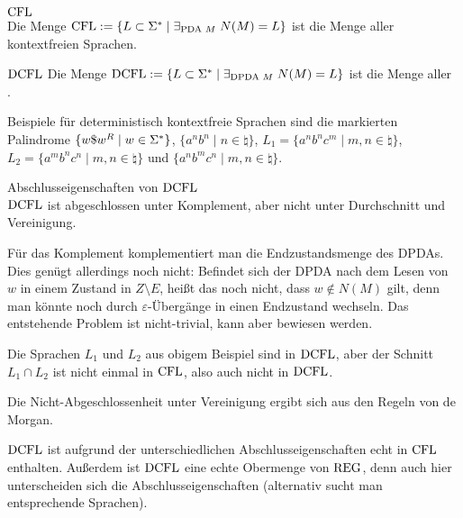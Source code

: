 \linie

\begin{Def}{$\text{CFL}$}\\
    Die Menge $\text{CFL} := \{L \subset \Sigma^\ast \;|\;
    \exists_{\text{PDA } M}\; N(M) = L\}$
    ist die Menge aller kontextfreien Sprachen.
\end{Def}

\begin{Def}{$\text{DCFL}$}
    Die Menge $\text{DCFL} := \{L \subset \Sigma^\ast \;|\;
    \exists_{\text{DPDA } M}\; N(M) = L\}$
    ist die Menge aller\\
    .
\end{Def}

\begin{Bsp}
    Beispiele für deterministisch kontextfreie Sprachen sind
    die markierten Palindrome $\{w \$ w^R \;|\; w \in \Sigma^\ast\}$,
    $\{a^n b^n \;|\; n \in \natural\}$,
    $L_1 = \{a^n b^n c^m \;|\; m, n \in \natural\}$,
    $L_2 = \{a^m b^n c^n \;|\; m, n \in \natural\}$ und
    $\{a^n b^m c^n \;|\; m, n \in \natural\}$.
\end{Bsp}

\linie

\begin{Satz}{Abschlusseigenschaften von $\text{DCFL}$}\\
    $\text{DCFL}$ ist abgeschlossen unter Komplement, aber nicht unter
    Durchschnitt und Vereinigung.
\end{Satz}

\begin{Beweis}
    Für das Komplement komplementiert man die Endzustandsmenge des DPDAs.
    Dies genügt allerdings noch nicht:
    Befindet sich der DPDA nach dem Lesen von $w$ in einem Zustand in
    $Z \setminus E$, heißt das noch nicht, dass $w \notin N(M)$ gilt,
    denn man könnte noch durch $\varepsilon$-Übergänge in einen Endzustand
    wechseln.
    Das entstehende Problem ist nicht-trivial, kann aber bewiesen werden.
    
    Die Sprachen $L_1$ und $L_2$ aus obigem Beispiel sind in $\text{DCFL}$,
    aber der Schnitt $L_1 \cap L_2$ ist nicht einmal in $\text{CFL}$, also auch
    nicht in $\text{DCFL}$.
    
    Die Nicht-Abgeschlossenheit unter Vereinigung ergibt sich aus den Regeln
    von de Morgan.
\end{Beweis}

\begin{Bem}
    $\text{DCFL}$ ist aufgrund der unterschiedlichen Abschlusseigenschaften echt in
    $\text{CFL}$ enthalten.
    Außerdem ist $\text{DCFL}$ eine echte Obermenge von $\text{REG}$, denn auch hier
    unterscheiden sich die Abschlusseigenschaften
    (alternativ sucht man entsprechende Sprachen).
\end{Bem}

